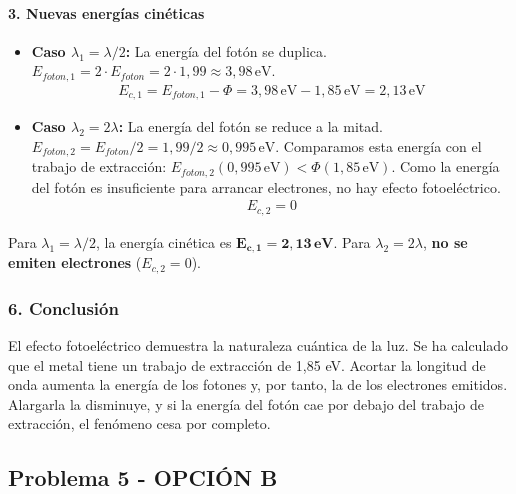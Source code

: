 \paragraph{3. Nuevas energías cinéticas}
\begin{itemize}
    \item \textbf{Caso $\lambda_1 = \lambda/2$:} La energía del fotón se duplica. $E_{foton,1} = 2 \cdot E_{foton} = 2 \cdot 1,99 \approx 3,98 \, \text{eV}$.
    \begin{gather}
        E_{c,1} = E_{foton,1} - \Phi = 3,98 \, \text{eV} - 1,85 \, \text{eV} = 2,13 \, \text{eV}
    \end{gather}
    \item \textbf{Caso $\lambda_2 = 2\lambda$:} La energía del fotón se reduce a la mitad. $E_{foton,2} = E_{foton}/2 = 1,99/2 \approx 0,995 \, \text{eV}$.
    Comparamos esta energía con el trabajo de extracción: $E_{foton,2} (0,995\,\text{eV}) < \Phi (1,85\,\text{eV})$.
    Como la energía del fotón es insuficiente para arrancar electrones, no hay efecto fotoeléctrico.
    \begin{gather}
        E_{c,2} = 0
    \end{gather}
\end{itemize}
\begin{cajaresultado}
Para $\lambda_1=\lambda/2$, la energía cinética es $\boldsymbol{E_{c,1} = 2,13 \, \textbf{eV}}$. Para $\lambda_2=2\lambda$, \textbf{no se emiten electrones} ($E_{c,2}=0$).
\end{cajaresultado}

\subsubsection*{6. Conclusión}
\begin{cajaconclusion}
El efecto fotoeléctrico demuestra la naturaleza cuántica de la luz. Se ha calculado que el metal tiene un trabajo de extracción de 1,85 eV. Acortar la longitud de onda aumenta la energía de los fotones y, por tanto, la de los electrones emitidos. Alargarla la disminuye, y si la energía del fotón cae por debajo del trabajo de extracción, el fenómeno cesa por completo.
\end{cajaconclusion}

\newpage

\subsection{Problema 5 - OPCIÓN B}
\label{subsec:5B_2009_jun_ord}

